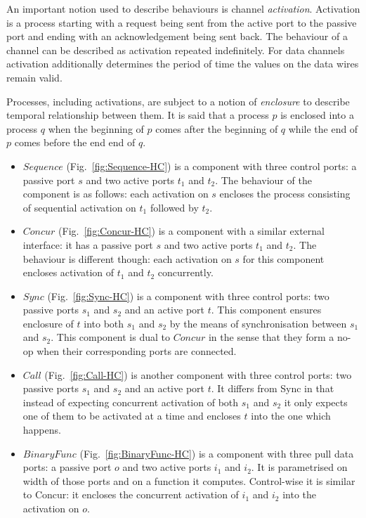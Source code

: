 An important notion used to describe behaviours is channel \emph{activation}. Activation is a process 
starting with a request being sent from the active port to the passive port and ending with an acknowledgement being sent back.
The behaviour of a channel can be described as activation repeated indefinitely. For data channels activation additionally determines 
the period of time the values on the data wires remain valid.

Processes, including activations, are subject to a notion of \emph{enclosure} to describe temporal relationship between them. 
It is said that a process $p$ is enclosed into a process $q$ when the beginning of $p$ comes after the beginning of $q$ while the end of $p$ comes before the end end of $q$.

\begin{itemize}
\item
$Sequence$ (Fig.~\ref{fig:Sequence-HC}) is a component with three control ports: a passive port $s$ and two active ports $t_1$ and $t_2$.
The behaviour of the component is as follows: each activation on $s$ encloses the process consisting of sequential activation on $t_1$ followed by $t_2$.

\item
$Concur$ (Fig.~\ref{fig:Concur-HC}) is a component with a similar external interface: it has a passive port $s$ and two active ports $t_1$ and $t_2$.
The behaviour is different though: each activation on $s$ for this component encloses activation of $t_1$ and $t_2$ concurrently.

\item
$Sync$ (Fig.~\ref{fig:Sync-HC}) is a component with three control ports: two passive ports $s_1$ and $s_2$ and an active port $t$.
This component ensures enclosure of $t$ into both $s_1$ and $s_2$ by the means of synchronisation between $s_1$ and $s_2$. This component is dual 
to $Concur$ in the sense that they form a no-op when their corresponding ports are connected.

\item
$Call$ (Fig.~\ref{fig:Call-HC}) is another component with three control ports: two passive ports $s_1$ and $s_2$ and an active port $t$.
It differs from Sync in that instead of expecting concurrent activation of both $s_1$ and $s_2$ it only expects one of them to be activated at a time and encloses $t$ into the one which happens.

\item
$BinaryFunc$ (Fig.~\ref{fig:BinaryFunc-HC}) is a component with three pull data ports: a passive port $o$ and two active ports $i_1$ and $i_2$. It is parametrised on width of those ports and on a function it computes. Control-wise it is similar to Concur: it encloses the concurrent activation of $i_1$ and $i_2$ into the activation on $o$.


\end{itemize}
